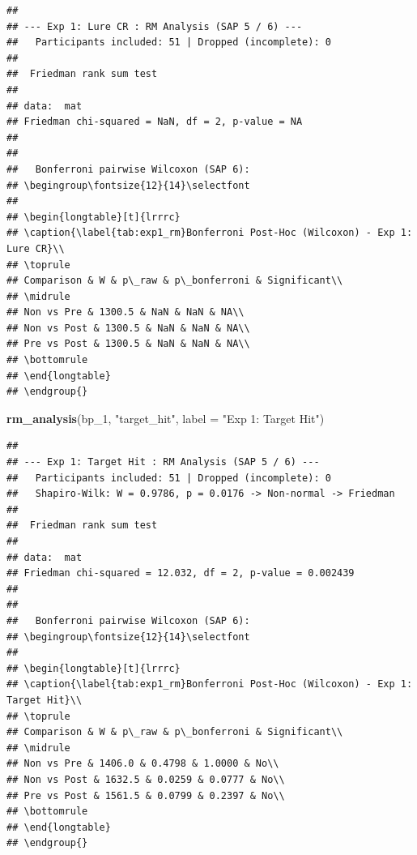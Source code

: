\documentclass[
]{article}
\newenvironment{Shaded}{\begin{snugshade}}{\end{snugshade}}
\newcommand{\AttributeTok}[1]{\textcolor[rgb]{0.13,0.29,0.53}{#1}}
\newcommand{\FunctionTok}[1]{\textcolor[rgb]{0.13,0.29,0.53}{\textbf{#1}}}
\newcommand{\NormalTok}[1]{#1}
\newcommand{\StringTok}[1]{\textcolor[rgb]{0.31,0.60,0.02}{#1}}
\begin{document}
\begin{verbatim}
## 
## --- Exp 1: Lure CR : RM Analysis (SAP 5 / 6) ---
##   Participants included: 51 | Dropped (incomplete): 0 
## 
##  Friedman rank sum test
## 
## data:  mat
## Friedman chi-squared = NaN, df = 2, p-value = NA
## 
## 
##   Bonferroni pairwise Wilcoxon (SAP 6):
## \begingroup\fontsize{12}{14}\selectfont
## 
## \begin{longtable}[t]{lrrrc}
## \caption{\label{tab:exp1_rm}Bonferroni Post-Hoc (Wilcoxon) - Exp 1: Lure CR}\\
## \toprule
## Comparison & W & p\_raw & p\_bonferroni & Significant\\
## \midrule
## Non vs Pre & 1300.5 & NaN & NaN & NA\\
## Non vs Post & 1300.5 & NaN & NaN & NA\\
## Pre vs Post & 1300.5 & NaN & NaN & NA\\
## \bottomrule
## \end{longtable}
## \endgroup{}
\end{verbatim}

\begin{Shaded}
\begin{Highlighting}[]
\FunctionTok{rm\_analysis}\NormalTok{(bp\_1, }\StringTok{"target\_hit"}\NormalTok{, }\AttributeTok{label =} \StringTok{"Exp 1: Target Hit"}\NormalTok{)}
\end{Highlighting}
\end{Shaded}

\begin{verbatim}
## 
## --- Exp 1: Target Hit : RM Analysis (SAP 5 / 6) ---
##   Participants included: 51 | Dropped (incomplete): 0 
##   Shapiro-Wilk: W = 0.9786, p = 0.0176 -> Non-normal -> Friedman
## 
##  Friedman rank sum test
## 
## data:  mat
## Friedman chi-squared = 12.032, df = 2, p-value = 0.002439
## 
## 
##   Bonferroni pairwise Wilcoxon (SAP 6):
## \begingroup\fontsize{12}{14}\selectfont
## 
## \begin{longtable}[t]{lrrrc}
## \caption{\label{tab:exp1_rm}Bonferroni Post-Hoc (Wilcoxon) - Exp 1: Target Hit}\\
## \toprule
## Comparison & W & p\_raw & p\_bonferroni & Significant\\
## \midrule
## Non vs Pre & 1406.0 & 0.4798 & 1.0000 & No\\
## Non vs Post & 1632.5 & 0.0259 & 0.0777 & No\\
## Pre vs Post & 1561.5 & 0.0799 & 0.2397 & No\\
## \bottomrule
## \end{longtable}
## \endgroup{}
\end{verbatim}
\end{document}
